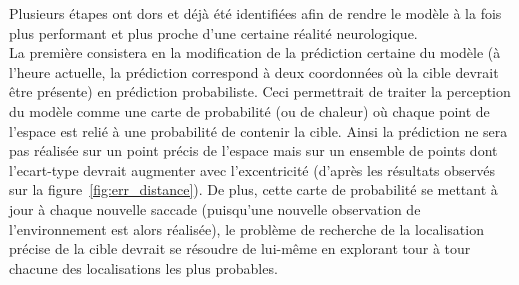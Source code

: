 	
Plusieurs étapes ont dors et déjà été identifiées afin de rendre le modèle à la fois plus performant et plus proche d'une certaine réalité neurologique.\\
La première consistera en la modification de la prédiction certaine du modèle (à l'heure actuelle, la prédiction correspond à deux coordonnées où la cible devrait être présente) en prédiction probabiliste. Ceci permettrait de traiter la perception du modèle comme une carte de probabilité (ou de chaleur) où chaque point de l'espace est relié à une probabilité de contenir la cible. Ainsi la prédiction ne sera pas réalisée sur un point précis de l'espace mais sur un ensemble de points dont l'ecart-type devrait augmenter avec l'excentricité (d'après les résultats observés sur la figure~\ref{fig:err_distance}). De plus, cette carte de probabilité se mettant à jour à chaque nouvelle saccade (puisqu'une nouvelle observation de l'environnement est alors réalisée), le problème de recherche de la localisation précise de la cible devrait se résoudre de lui-même en explorant tour à tour chacune des localisations les plus probables.